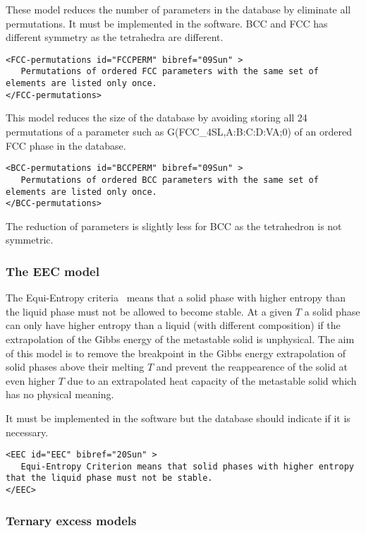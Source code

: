 \documentclass[12pt]{article}
\begin{document}
\begin{appendices}
These model reduces the number of parameters in the database by
eliminate all permutations.  It must be implemented in the software.
BCC and FCC has different symmetry as the tetrahedra are different.

{\small
\begin{verbatim}
<FCC-permutations id="FCCPERM" bibref="09Sun" >
   Permutations of ordered FCC parameters with the same set of elements are listed only once.
</FCC-permutations>
\end{verbatim}
}

This model reduces the size of the database by avoiding storing all 24
permutations of a parameter such as G(FCC\_4SL,A:B:C:D:VA;0) of an
ordered FCC phase in the database.

{\small
\begin{verbatim}
<BCC-permutations id="BCCPERM" bibref="09Sun" >
   Permutations of ordered BCC parameters with the same set of elements are listed only once.
</BCC-permutations>
\end{verbatim}
}

The reduction of parameters is slightly less for BCC as the
tetrahedron is not symmetric.

\subsubsection{The EEC model}\label{sc:EEC}

The Equi-Entropy criteria~\cite{20Sun} means that a solid phase with
higher entropy than the liquid phase must not be allowed to become
stable.  At a given $T$ a solid phase can only have higher entropy
than a liquid (with different composition) if the extrapolation of the
Gibbs energy of the metastable solid is unphysical.  The aim of this
model is to remove the breakpoint in the Gibbs energy extrapolation of
solid phases above their melting $T$ and prevent the reappearence of
the solid at even higher $T$ due to an extrapolated heat capacity of
the metastable solid which has no physical meaning.

It must be implemented in the software but the database should
indicate if it is necessary.

{\small
\begin{verbatim}
<EEC id="EEC" bibref="20Sun" >
   Equi-Entropy Criterion means that solid phases with higher entropy that the liquid phase must not be stable.
</EEC>
\end{verbatim}
}


\subsubsection{Ternary excess models}\label{sc:peltonexcess}


\end{appendices}
\end{document}
